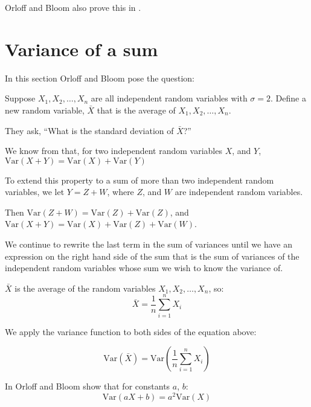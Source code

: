 \documentclass[a4paper,11pt]{article}
\begin{document}
Orloff and Bloom also prove this in \cite{reading5a}.

\section{Variance of a sum}

In this section Orloff and Bloom pose the question:

Suppose $X_{1}, X_{2}, \ldots, X_{n}$ are all independent random variables
with $\sigma = 2$.  Define a new random variable, $\bar{X}$ that is the average
of $X_{1}, X_{2}, \ldots, X_{n}$.

They ask, ``What is the standard deviation of $\bar{X}$?''

We know from \cite{reading5a} that, for two independent random variables $X$,
and $Y$, $\text{Var}\left( X + Y \right) = \text{Var}\left( X \right) +
\text{Var}\left( Y \right)$

To extend this property to a sum of more than two independent random variables,
we let $Y=Z+W$, where $Z$, and $W$ are independent random variables.

Then $\text{Var}\left( Z + W \right) = \text{Var}\left( Z \right) +
\text{Var}\left( Z \right)$, and $\text{Var}\left( X + Y\right) =
  \text{Var}\left( X \right) + \text{Var}\left(Z \right)
  + \text{Var}\left(W \right)$.

We continue to rewrite the last term in the sum of variances until we have
an expression on the right hand side of the sum that is the sum of variances
of the independent random variables whose sum we wish to know the variance of.

$\bar{X}$ is the average of the random variables $X_{1}, X_{2}, \ldots, X_{n}$,
so:
\begin{equation}
\bar{X}
  = \frac{1}{n}\sum_{i=1}^{n} X_{i}
\end{equation}

We apply the variance function to both sides of the equation above:


\begin{equation}
\text{Var}\left( \bar{X} \right)
  = \text{Var} \left( \frac{1}{n}\sum_{i=1}^{n} X_{i} \right)
\end{equation}

In \cite{reading5a} Orloff and Bloom show that for constants $a$, $b$:
\begin{equation}
  \text{Var} \left( aX + b \right) = a^{2}\text{Var}\left(X \right)
\end{equation}
\end{document}

